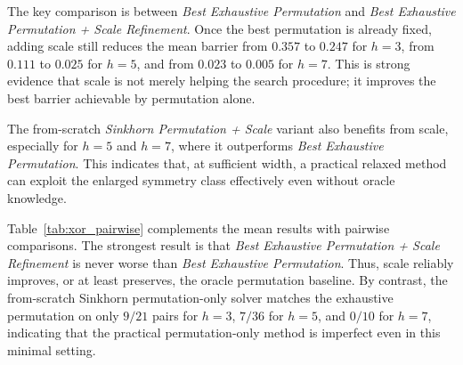 \documentclass[11pt,a4paper]{report}
\begin{document}
The key comparison is between \emph{Best Exhaustive Permutation} and \emph{Best Exhaustive Permutation + Scale Refinement}. Once the best permutation is already fixed, adding scale still reduces the mean barrier from \(0.357\) to \(0.247\) for \(h=3\), from \(0.111\) to \(0.025\) for \(h=5\), and from \(0.023\) to \(0.005\) for \(h=7\). This is strong evidence that scale is not merely helping the search procedure; it improves the best barrier achievable by permutation alone.

The from-scratch \emph{Sinkhorn Permutation + Scale} variant also benefits from scale, especially for \(h=5\) and \(h=7\), where it outperforms \emph{Best Exhaustive Permutation}. This indicates that, at sufficient width, a practical relaxed method can exploit the enlarged symmetry class effectively even without oracle knowledge.

\begin{table}[H]
\centering
\small
{}
\caption{Pairwise comparison counts across valid XOR model pairs. Lower barrier is better. Here, Exh.\ Perm.\ denotes Best Exhaustive Permutation, Exh.\ Perm.\ + Scale Ref.\ denotes Best Exhaustive Permutation + Scale Refinement, Sinkhorn Perm.\ Only denotes Sinkhorn Permutation Only, and Sinkhorn Perm.\ + Scale denotes Sinkhorn Permutation + Scale.}
\label{tab:xor_pairwise}
\end{table}
Table~\ref{tab:xor_pairwise} complements the mean results with pairwise comparisons. The strongest result is that \emph{Best Exhaustive Permutation + Scale Refinement} is never worse than \emph{Best Exhaustive Permutation}. Thus, scale reliably improves, or at least preserves, the oracle permutation baseline. By contrast, the from-scratch Sinkhorn permutation-only solver matches the exhaustive permutation on only \(9/21\) pairs for \(h=3\), \(7/36\) for \(h=5\), and \(0/10\) for \(h=7\), indicating that the practical permutation-only method is imperfect even in this minimal setting.
\end{document}
